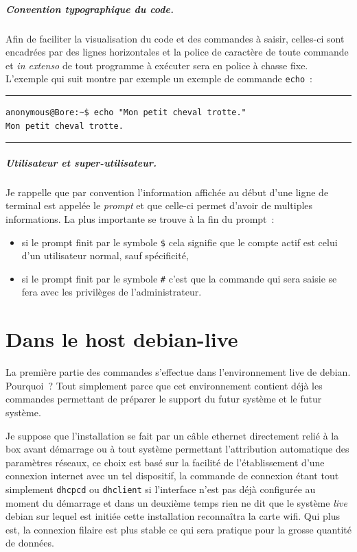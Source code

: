 \documentclass[12pt, a4paper]{report}
\begin{document}
\paragraph{Convention typographique du code.} 
Afin de faciliter la visualisation du code et des commandes à saisir, celles-ci sont encadrées par des lignes horizontales et la police de caractère de toute commande et \emph{in extenso} de tout programme à exécuter sera en police à chasse fixe. 
L'exemple qui suit montre par exemple un exemple de commande \texttt{echo}~:

\noindent\rule{\linewidth}{0.5pt}
\begin{verbatim}
anonymous@Bore:~$ echo "Mon petit cheval trotte."
Mon petit cheval trotte.
\end{verbatim}
\rule{\linewidth}{0.5pt}

\paragraph{Utilisateur et super-utilisateur.}
Je rappelle que par convention l'information affichée au début d'une ligne de terminal est appelée le \emph{prompt\/} et que celle-ci permet d'avoir de multiples informations. 
La plus importante se trouve à la fin du prompt~:
\begin{itemize}
	\item si le prompt finit par le symbole \texttt{\$} cela signifie que le compte actif est celui d'un utilisateur normal, sauf spécificité,
	\item si le prompt finit par le symbole \texttt{\#} c'est que la commande qui sera saisie se fera avec les privilèges de l'administrateur.
\end{itemize}

\chapter{Dans le host debian-live}
La première partie des commandes s'effectue dans l'environnement live de debian. 
Pourquoi~? 
Tout simplement parce que cet environnement contient déjà les commandes permettant de préparer le support du futur système et le futur système.

Je suppose que l'installation se fait par un câble ethernet directement relié à la box avant démarrage ou à tout système permettant l'attribution automatique des paramètres réseaux, ce choix est basé sur la facilité de l'établissement d'une connexion internet avec un tel dispositif, la commande de connexion étant tout simplement \texttt{dhcpcd} ou \texttt{dhclient} si l'interface n'est pas déjà configurée au moment du démarrage et dans un deuxième temps rien ne dit que le système \emph{live} debian sur lequel est initiée cette installation reconnaîtra la carte wifi. 
Qui plus est, la connexion filaire est plus stable ce qui sera pratique pour la grosse quantité de données.
\end{document}
